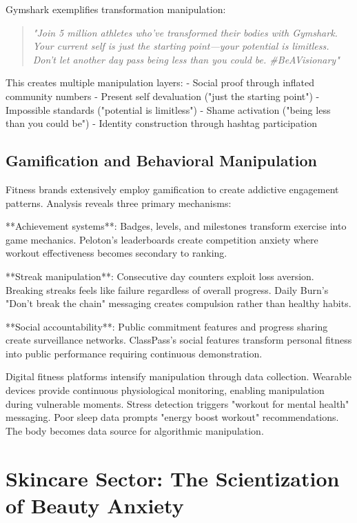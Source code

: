 Gymshark exemplifies transformation manipulation:

\begin{quote}
\textit{"Join 5 million athletes who've transformed their bodies with Gymshark. Your current self is just the starting point—your potential is limitless. Don't let another day pass being less than you could be. #BeAVisionary"}
\end{quote}

This creates multiple manipulation layers:
- Social proof through inflated community numbers
- Present self devaluation ("just the starting point")
- Impossible standards ("potential is limitless")
- Shame activation ("being less than you could be")
- Identity construction through hashtag participation

\subsection{Gamification and Behavioral Manipulation}

Fitness brands extensively employ gamification to create addictive engagement patterns. Analysis reveals three primary mechanisms:

**Achievement systems**: Badges, levels, and milestones transform exercise into game mechanics. Peloton's leaderboards create competition anxiety where workout effectiveness becomes secondary to ranking.

**Streak manipulation**: Consecutive day counters exploit loss aversion. Breaking streaks feels like failure regardless of overall progress. Daily Burn's "Don't break the chain" messaging creates compulsion rather than healthy habits.

**Social accountability**: Public commitment features and progress sharing create surveillance networks. ClassPass's social features transform personal fitness into public performance requiring continuous demonstration.

Digital fitness platforms intensify manipulation through data collection. Wearable devices provide continuous physiological monitoring, enabling manipulation during vulnerable moments. Stress detection triggers "workout for mental health" messaging. Poor sleep data prompts "energy boost workout" recommendations. The body becomes data source for algorithmic manipulation.

\section{Skincare Sector: The Scientization of Beauty Anxiety}
\label{sec:skincare_analysis}

